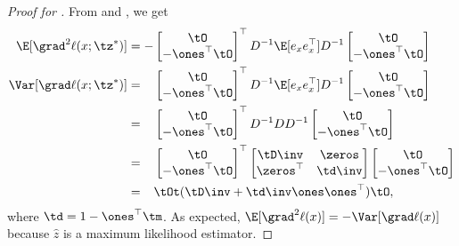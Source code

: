 \begin{proof}[Proof for ]
From  and , we get
  \begin{align*}
    \E[\grad^2 \ell(x; \tz^*)] 
    &= -
        \begin{bmatrix}
          \tO \\
          -\ones^\top \tO
        \end{bmatrix}^\top
          D^{-1} \E[e_x e_x^\top] D^{-1} 
        \begin{bmatrix}
          \tO \\
          -\ones^\top \tO
        \end{bmatrix} \\
    \Var [\grad \ell(x; \tz^*)] 
    &= \hphantom{-}
        \begin{bmatrix}
          \tO \\
          -\ones^\top \tO
        \end{bmatrix}^\top
          D^{-1} \E[e_x e_x^\top] D^{-1} 
        \begin{bmatrix}
          \tO \\
          -\ones^\top \tO
        \end{bmatrix} \\
    &= \hphantom{-}
        \begin{bmatrix}
          \tO \\
          -\ones^\top \tO
        \end{bmatrix}^\top
          D^{-1} D D^{-1} 
        \begin{bmatrix}
          \tO \\
          -\ones^\top \tO
        \end{bmatrix} \\
    &= \hphantom{-}
        \begin{bmatrix}
          \tO \\
          - \ones^\top \tO
        \end{bmatrix}^\top
        \begin{bmatrix}
          \tD\inv & \zeros \\
          \zeros^\top & \td\inv
        \end{bmatrix}
        \begin{bmatrix}
          \tO \\
          - \ones^\top \tO
        \end{bmatrix} \\
        &= \hphantom{-} \tOt (\tD\inv + \td\inv \ones \ones^\top) \tO,
  \end{align*}
where $\td = 1 - \ones^\top \tm$.
As expected, $\E[\grad^2 \ell(x)] = -\Var [\grad \ell(x)]$ because
$\hat{z}$ is a maximum likelihood estimator. 


\end{proof}
